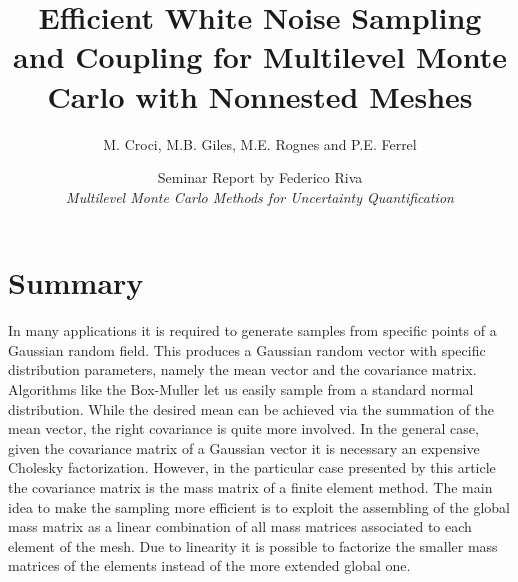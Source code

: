 \documentclass[a4paper, 11pt, oneside]{scrartcl}
\title{ Efficient White Noise Sampling and Coupling for Multilevel Monte Carlo with Nonnested Meshes}
\author{M. Croci, M.B. Giles, M.E. Rognes and P.E. Ferrel}
\date{Seminar Report by Federico Riva\\
\textit{Multilevel Monte Carlo Methods for Uncertainty Quantification} }
\begin{document}
\maketitle
\thispagestyle{empty}

\section{Summary}
In many applications it is required to generate samples from specific points of a Gaussian random field. This produces a Gaussian random vector with specific distribution parameters, namely the mean vector and the covariance matrix.
Algorithms like the Box-Muller let us easily sample from a standard normal distribution. While the desired mean can be achieved via the summation of the mean vector, the right covariance is quite more involved. In the general case, given the covariance matrix of a Gaussian vector it is necessary an expensive Cholesky factorization. 
However, in the particular case presented by this article the covariance matrix is the mass matrix of a finite element method. The main idea to make the sampling more efficient is to exploit the assembling of the global mass matrix as a linear combination of all mass matrices associated to each element of the mesh. Due to linearity it is possible to factorize the smaller mass matrices of the elements instead of the more extended global one. 
\end{document}

